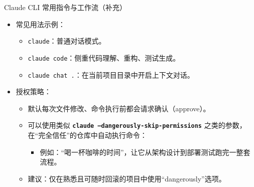 \documentclass[aspectratio=169]{beamer}
\begin{document}
\begin{frame}{Claude CLI 常用指令与工作流（补充）}
  \begin{itemize}
    \item 常见用法示例：
      \begin{itemize}
        \item \texttt{claude}：普通对话模式。
        \item \texttt{claude code}：侧重代码理解、重构、测试生成。
        \item \texttt{claude chat .}：在当前项目目录中开启上下文对话。
      \end{itemize}
    \item 授权策略：
      \begin{itemize}
        \item 默认每次文件修改、命令执行前都会请求确认（approve）。
        \item 可以使用类似 \textbf{\texttt{claude --dangerously-skip-permissions}} 之类的参数，
              在“完全信任”的仓库中自动执行命令：
          \begin{itemize}
            \item 例如：“喝一杯咖啡的时间”，让它从架构设计到部署测试跑完一整套流程。
          \end{itemize}
        \item 建议：仅在熟悉且可随时回滚的项目中使用“dangerously”选项。
      \end{itemize}
  \end{itemize}
\end{frame}
\end{document}

